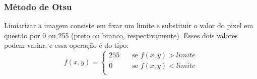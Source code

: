 \documentclass[conference,harvard,brazil,english]{sbatex}
\begin{document}
\subsubsection{Método de Otsu}
	Limiarizar a imagem consiste em fixar um limite e substituir o valor do pixel em questão por 0 ou 255 (preto ou branco, respectivamente). Esses dois valores podem variar, e essa operação é do tipo:
$$
 f(x,y) =
  \begin{cases}
   255       & \quad \text{se } f(x,y) > limite \\
     0 & \quad \text{se } f(x,y) < limite \\
  \end{cases}
$$
\end{document}
